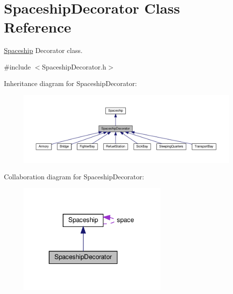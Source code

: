 \hypertarget{classSpaceshipDecorator}{}\section{Spaceship\+Decorator Class Reference}
\label{classSpaceshipDecorator}


\hyperlink{classSpaceship}{Spaceship} Decorator class.  




{\ttfamily \#include $<$Spaceship\+Decorator.\+h$>$}



Inheritance diagram for Spaceship\+Decorator\+:\nopagebreak
\begin{figure}[H]
\begin{center}
\leavevmode
\includegraphics[width=350pt]{classSpaceshipDecorator__inherit__graph}
\end{center}
\end{figure}


Collaboration diagram for Spaceship\+Decorator\+:\nopagebreak
\begin{figure}[H]
\begin{center}
\leavevmode
\includegraphics[width=212pt]{classSpaceshipDecorator__coll__graph}
\end{center}
\end{figure}
